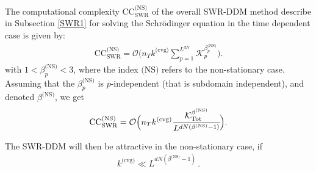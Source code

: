 \begin{prop}
The computational complexity $\textrm{CC}^{\textrm{(NS)}}_{\textrm{SWR}}$ of the overall SWR-DDM method describe in Subsection \ref{SWR1} for solving the Schr\"odinger equation in the time dependent case is given by:
\begin{eqnarray}\label{CC4} 
\textrm{CC}^{\textrm{(NS)}}_{\textrm{SWR}} = \mathcal{O}\big(n_Tk^{\textrm{(cvg)}}\sum_{p=1}^{L^{dN}}\mathcal{K}_p^{\beta^{\textrm{(NS)}}_p}\big).
\end{eqnarray}
with $1< \beta_p^{\textrm{(NS)}} <  3$, where the index $\textrm{(NS)}$ refers to the non-stationary case. Assuming that the $\beta^{\textrm{(NS)}}_p$  is $p$-independent (that is subdomain independent),  and denoted $\beta^{\textrm{(NS)}}$, we get
\begin{eqnarray*}
\textrm{CC}^{\textrm{(NS)}}_{\textrm{SWR}} = \mathcal{O}\Big(n_Tk^{\textrm{(cvg)}}\cfrac{\mathcal{K}_{\textrm{Tot}}^{\beta^{\textrm{(NS)}}}}{L^{dN(\beta^{\textrm{(NS)}}-1)}}\Big).
\end{eqnarray*}
\end{prop}
The SWR-DDM will then be attractive in the non-stationary case, if 
\begin{eqnarray*}
k^{\textrm{(cvg)}} \ll L^{dN(\beta^{\textrm{(NS)}}-1)} \, .
\end{eqnarray*}
